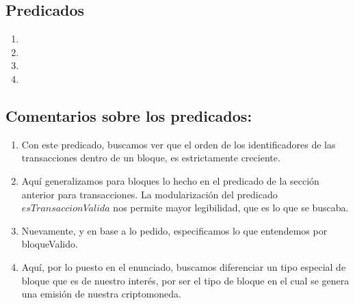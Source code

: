 \documentclass[10pt,a4paper]{article}
\begin{document}
\subsection{Predicados}

\begin{enumerate}

        \item {}

        \item {}

       \item {}

        \item {}
        
\end{enumerate}

\subsection{Comentarios sobre los predicados: }

\begin{enumerate}
   \item Con este predicado, buscamos ver que el orden de los identificadores de las transacciones dentro de un bloque, es estrictamente creciente.
    
   \item  Aquí generalizamos para bloques lo hecho en el predicado de la sección anterior para transacciones. La modularización del predicado $esTransaccionValida$ nos permite mayor legibilidad, que es lo que se buscaba.
    
    \item Nuevamente, y en base a lo pedido, especificamos lo que entendemos por bloqueValido.
    
    \item Aquí, por lo puesto en el enunciado, buscamos diferenciar un tipo especial de bloque que es de nuestro interés, por ser el tipo de bloque en el cual se genera una emisión de nuestra criptomoneda.
\end{enumerate}
\end{document}
